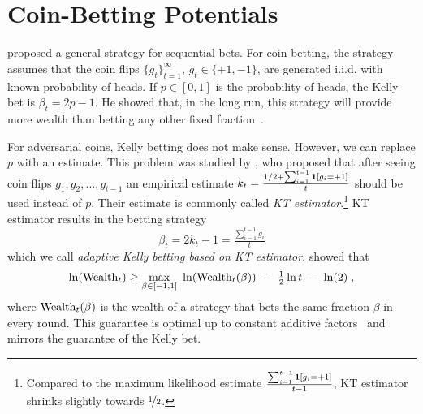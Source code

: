 \section{Coin-Betting Potentials}
\label{section:coin-betting-potentials}

\citet{Kelly-1956} proposed a general strategy for sequential bets. For coin
betting, the strategy assumes that the coin flips $\{g_t\}_{t=1}^\infty$, $g_t
\in \{+1,-1\}$, are generated i.i.d. with known probability of heads. If $p \in
[0,1]$ is the probability of heads, the Kelly bet is
$\beta_t = 2p - 1$.
He showed that, in the long run, this strategy will provide more wealth than betting any other fixed fraction~\cite{Kelly-1956}.

For adversarial coins, Kelly betting does not make sense. However, we can
replace $p$ with an estimate. This problem was studied by \citet{Krichevsky-Trofimov-1981},
who proposed that after seeing coin flips $g_1, g_2, \dots, g_{t-1}$ an
empirical estimate $k_t = \frac{1/2 + \sum_{i=1}^{t-1} \mathbf{1}[g_i = +1]}{t}$
should be used instead of $p$. Their estimate is commonly called \emph{KT
estimator}.\footnote{Compared to the maximum likelihood estimate
$\frac{\sum_{i=1}^{t-1} \mathbf{1}[g_i = +1]}{t-1}$, KT estimator shrinks
slightly towards $\nicefrac{1}{2}$.} KT estimator results in the betting strategy
\begin{equation}
\label{equation:kt-estimator-betting-strategy}
\beta_t = 2k_t - 1 = \tfrac{\sum_{i=1}^{t-1} g_i}{t}
\end{equation}
which we call \emph{adaptive Kelly betting based on KT estimator}.
\citeauthor{Krichevsky-Trofimov-1981} showed that
\[
\ln(\Wealth_t) \ge \max_{\beta \in [-1,1]} \  \ln(\Wealth_t(\beta)) \ - \ \tfrac{1}{2} \ln t \ - \ \ln(2) \; ,
\]
where $\operatorname{Wealth}_t(\beta)$ is the wealth of a strategy that bets the same
fraction $\beta$ in every round. This guarantee is optimal up to constant
additive factors~\citep{Cesa-Bianchi-Lugosi-2006} and mirrors the guarantee of the Kelly bet.

